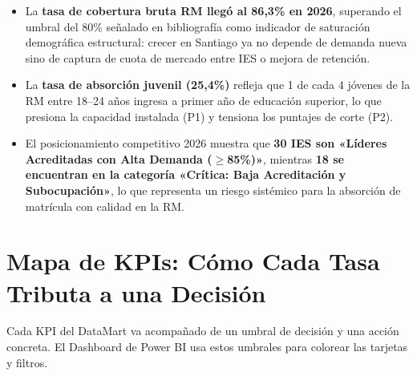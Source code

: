 \documentclass[11pt,a4paper]{article}
\begin{document}
\begin{itemize}[leftmargin=*]
  \item La \textbf{tasa de cobertura bruta RM llegó al 86,3\% en 2026}, superando el
        umbral del 80\% señalado en bibliografía como indicador de saturación demográfica
        estructural: crecer en Santiago ya no depende de demanda nueva sino de captura
        de cuota de mercado entre IES o mejora de retención.
  \item La \textbf{tasa de absorción juvenil (25,4\%)} refleja que 1 de cada 4 jóvenes
        de la RM entre 18--24 años ingresa a primer año de educación superior, lo que
        presiona la capacidad instalada (P1) y tensiona los puntajes de corte (P2).
  \item El posicionamiento competitivo 2026 muestra que \textbf{30 IES son «Líderes
        Acreditadas con Alta Demanda ($\geq$85\%)»}, mientras \textbf{18 se encuentran
        en la categoría «Crítica: Baja Acreditación y Subocupación»}, lo que representa
        un riesgo sistémico para la absorción de matrícula con calidad en la RM.
\end{itemize}

\section{Mapa de KPIs: Cómo Cada Tasa Tributa a una Decisión}
\label{sec:kpis}

\begin{tcolorbox}[colback=lightbg, colframe=secondaryblue, breakable,
    title=\textbf{Respuesta directa al feedback: «¿Y las medidas tributan a sus propuestas de valor?»}]
Cada KPI del DataMart va acompañado de un umbral de decisión y una acción concreta.
El Dashboard de Power BI usa estos umbrales para colorear las tarjetas y filtros.
\end{tcolorbox}
\end{document}
